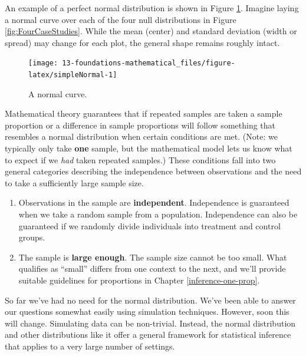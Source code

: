 \documentclass[
  10pt,
  openany]{book}
\begin{document}
An example of a perfect normal distribution is shown in Figure \ref{fig:simpleNormal}.
Imagine laying a normal curve over each of the four null distributions in Figure \ref{fig:FourCaseStudies}.
While the mean (center) and standard deviation (width or spread) may change for each plot, the general shape remains roughly intact.

\begin{figure}[h]

{\centering \texttt{[image: 13-foundations-mathematical\_files/figure-latex/simpleNormal-1]} 

}

\caption{A normal curve.}\label{fig:simpleNormal}
\end{figure}

Mathematical theory guarantees that if repeated samples are taken a sample proportion or a difference in sample proportions will follow something that resembles a normal distribution when certain conditions are met.
(Note: we typically only take \textbf{one} sample, but the mathematical model lets us know what to expect if we \emph{had} taken repeated samples.) These conditions fall into two general categories describing the independence between observations and the need to take a sufficiently large sample size.

\begin{enumerate}
\def\labelenumi{\arabic{enumi}.}
\item
  Observations in the sample are \textbf{independent}.
  Independence is guaranteed when we take a random sample from a population.
  Independence can also be guaranteed if we randomly divide individuals into treatment and control groups.
\item
  The sample is \textbf{large enough}.
  The sample size cannot be too small.
  What qualifies as ``small'' differs from one context to the next, and we'll provide suitable guidelines for proportions in Chapter \ref{inference-one-prop}.
\end{enumerate}

So far we've had no need for the normal distribution.
We've been able to answer our questions somewhat easily using simulation techniques.
However, soon this will change.
Simulating data can be non-trivial.
Instead, the normal distribution and other distributions like it offer a general framework for statistical inference that applies to a very large number of settings.
\end{document}
